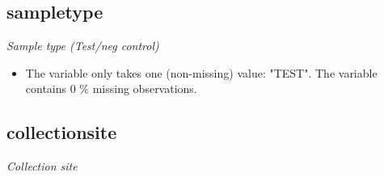 \documentclass[]{article}
\providecommand{\tightlist}{%
  \setlength{\itemsep}{0pt}\setlength{\parskip}{0pt}}
\begin{document}
\noindent\makebox[\linewidth]{\rule{\textwidth}{0.4pt}}

\hypertarget{sampletype}{%
\subsection{sampletype}\label{sampletype}}

\emph{Sample type (Test/neg control)}

\begin{itemize}
\tightlist
\item
  The variable only takes one (non-missing) value: "TEST". The variable
  contains 0 \% missing observations.
\end{itemize}

\noindent\makebox[\linewidth]{\rule{\textwidth}{0.4pt}}

\hypertarget{collectionsite}{%
\subsection{collectionsite}\label{collectionsite}}

\emph{Collection site}
\end{document}
